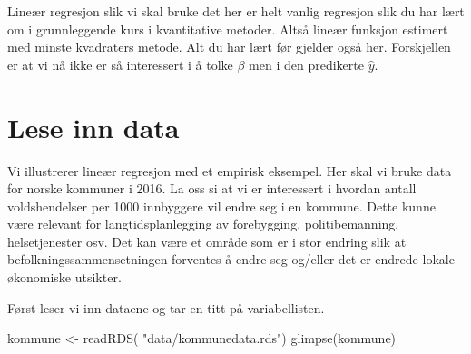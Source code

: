 \documentclass[
  letterpaper,
  DIV=11,
  numbers=noendperiod]{scrreprt}
\newenvironment{Shaded}{\begin{snugshade}}{\end{snugshade}}
\newcommand{\FunctionTok}[1]{\textcolor[rgb]{0.28,0.35,0.67}{#1}}
\newcommand{\NormalTok}[1]{\textcolor[rgb]{0.00,0.23,0.31}{#1}}
\newcommand{\OtherTok}[1]{\textcolor[rgb]{0.00,0.23,0.31}{#1}}
\newcommand{\StringTok}[1]{\textcolor[rgb]{0.13,0.47,0.30}{#1}}
\begin{document}
Lineær regresjon slik vi skal bruke det her er helt vanlig regresjon
slik du har lært om i grunnleggende kurs i kvantitative metoder. Altså
lineær funksjon estimert med minste kvadraters metode. Alt du har lært
før gjelder også her. Forskjellen er at vi nå ikke er så interessert i å
tolke \(\beta\) men i den predikerte \(\hat{y}\).

\section{Lese inn data}\label{lese-inn-data}

Vi illustrerer lineær regresjon med et empirisk eksempel. Her skal vi
bruke data for norske kommuner i 2016. La oss si at vi er interessert i
hvordan antall voldshendelser per 1000 innbyggere vil endre seg i en
kommune. Dette kunne være relevant for langtidsplanlegging av
forebygging, politibemanning, helsetjenester osv. Det kan være et område
som er i stor endring slik at befolkningssammensetningen forventes å
endre seg og/eller det er endrede lokale økonomiske utsikter.

Først leser vi inn dataene og tar en titt på variabellisten.

\begin{Shaded}
\begin{Highlighting}[]
\NormalTok{kommune }\OtherTok{\textless{}{-}} \FunctionTok{readRDS}\NormalTok{( }\StringTok{"data/kommunedata.rds"}\NormalTok{)}
\FunctionTok{glimpse}\NormalTok{(kommune)}
\end{Highlighting}
\end{Shaded}
\end{document}
